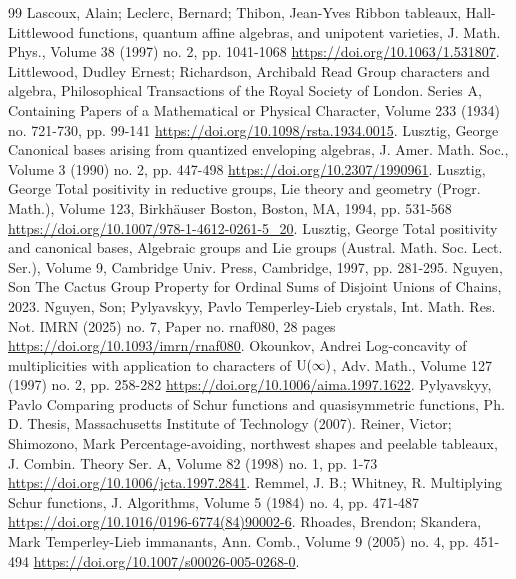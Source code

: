 \documentclass[10pt,a4paper]{article}
\theoremstyle{definition}
\numberwithin{equation}{section}
\begin{document}
\begin{thebibliography}{99}
 Lascoux, Alain; Leclerc, Bernard; Thibon, Jean-Yves Ribbon tableaux, Hall-Littlewood functions, quantum affine algebras, and unipotent varieties, J. Math. Phys., Volume 38 (1997) no. 2, pp. 1041-1068 \url{https://doi.org/10.1063/1.531807}.
 Littlewood, Dudley Ernest; Richardson, Archibald Read Group characters and algebra, Philosophical Transactions of the Royal Society of London. Series A, Containing Papers of a Mathematical or Physical Character, Volume 233 (1934) no. 721-730, pp. 99-141 \url{https://doi.org/10.1098/rsta.1934.0015}.
 Lusztig, George Canonical bases arising from quantized enveloping algebras, J. Amer. Math. Soc., Volume 3 (1990) no. 2, pp. 447-498 \url{https://doi.org/10.2307/1990961}.
 Lusztig, George Total positivity in reductive groups, Lie theory and geometry (Progr. Math.), Volume 123, Birkhäuser Boston, Boston, MA, 1994, pp. 531-568 \url{https://doi.org/10.1007/978-1-4612-0261-5_20}.
 Lusztig, George Total positivity and canonical bases, Algebraic groups and Lie groups (Austral. Math. Soc. Lect. Ser.), Volume 9, Cambridge Univ. Press, Cambridge, 1997, pp. 281-295.
 Nguyen, Son The Cactus Group Property for Ordinal Sums of Disjoint Unions of Chains, 2023.
 Nguyen, Son; Pylyavskyy, Pavlo Temperley-Lieb crystals, Int. Math. Res. Not. IMRN (2025) no. 7, Paper no. rnaf080, 28 pages \url{https://doi.org/10.1093/imrn/rnaf080}.
 Okounkov, Andrei Log-concavity of multiplicities with application to characters of ${\rm {U}}(\infty )$, Adv. Math., Volume 127 (1997) no. 2, pp. 258-282 \url{https://doi.org/10.1006/aima.1997.1622}.
 Pylyavskyy, Pavlo Comparing products of Schur functions and quasisymmetric functions, Ph. D. Thesis, Massachusetts Institute of Technology (2007).
 Reiner, Victor; Shimozono, Mark Percentage-avoiding, northwest shapes and peelable tableaux, J. Combin. Theory Ser. A, Volume 82 (1998) no. 1, pp. 1-73 \url{https://doi.org/10.1006/jcta.1997.2841}.
 Remmel, J. B.; Whitney, R. Multiplying Schur functions, J. Algorithms, Volume 5 (1984) no. 4, pp. 471-487 \url{https://doi.org/10.1016/0196-6774(84)90002-6}.
 Rhoades, Brendon; Skandera, Mark Temperley-Lieb immanants, Ann. Comb., Volume 9 (2005) no. 4, pp. 451-494 \url{https://doi.org/10.1007/s00026-005-0268-0}.

\end{thebibliography}
\end{document}
